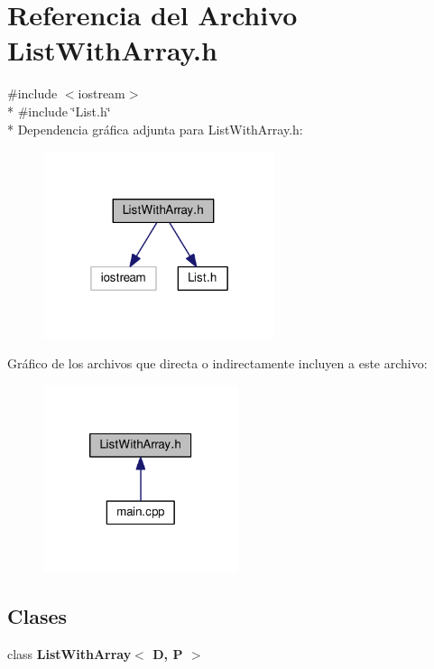 \section{Referencia del Archivo List\-With\-Array.\-h}
\label{_list_with_array_8h}
{\ttfamily \#include $<$iostream$>$}\\*
{\ttfamily \#include \char`\"{}List.\-h\char`\"{}}\\*
Dependencia gráfica adjunta para List\-With\-Array.\-h\-:\nopagebreak
\begin{figure}[H]
\begin{center}
\leavevmode
\includegraphics[width=193pt]{_list_with_array_8h__incl}
\end{center}
\end{figure}
Gráfico de los archivos que directa o indirectamente incluyen a este archivo\-:\nopagebreak
\begin{figure}[H]
\begin{center}
\leavevmode
\includegraphics[width=162pt]{_list_with_array_8h__dep__incl}
\end{center}
\end{figure}
\subsection*{Clases}
\begin{DoxyCompactItemize}
\item 
class {\bf List\-With\-Array$<$ D, P $>$}
\end{DoxyCompactItemize}
